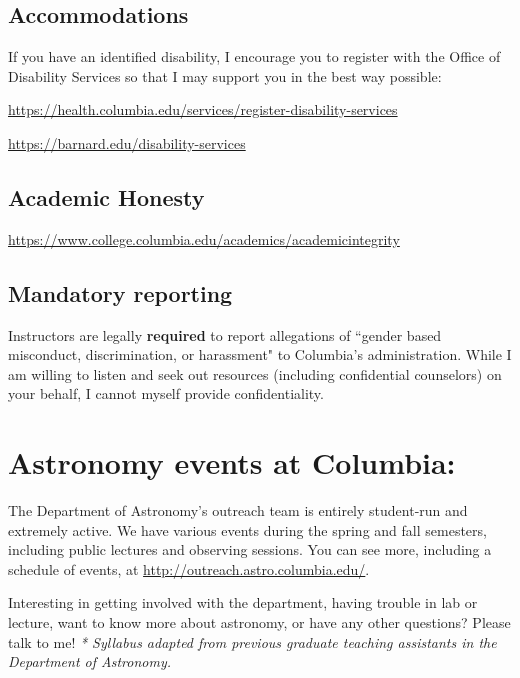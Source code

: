 \documentclass[11pt]{article}
\begin{document}
\subsection*{Accommodations}
If you have an identified disability, I encourage you to register with the Office of Disability Services so that I may support you in the best way possible: 

\href{https://health.columbia.edu/services/register-disability-services}{https://health.columbia.edu/services/register-disability-services} 

\href{https://barnard.edu/disability-services}{https://barnard.edu/disability-services}
 
\subsection*{Academic Honesty}
\href{https://www.college.columbia.edu/academics/academicintegrity}{https://www.college.columbia.edu/academics/academicintegrity}
 
\subsection*{Mandatory reporting}
Instructors are legally \textbf{required} to report allegations of ``gender based misconduct, discrimination, or harassment" to Columbia's administration. While I am willing to listen and seek out resources (including confidential counselors) on your behalf, I cannot myself provide confidentiality.

\section*{Astronomy events at Columbia:}

\noindent The Department of Astronomy's outreach team is entirely student-run and extremely active. We have various events during the spring and fall semesters, including public lectures and observing sessions. You can see more, including a schedule of events, at \href{http://outreach.astro.columbia.edu/}{http://outreach.astro.columbia.edu/}. 

Interesting in getting involved with the department, having trouble in lab or lecture, want to know more about astronomy, or have any other questions? Please talk to me!
\vfill
\textit{* Syllabus adapted from previous graduate teaching assistants in the Department of Astronomy.}
\end{document}
